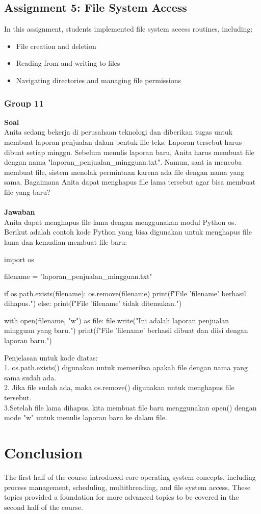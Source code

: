 \documentclass[12pt]{article}
\begin{document}
\subsection{Assignment 5: File System Access}
In this assignment, students implemented file system access routines, including:
\begin{itemize}
    \item File creation and deletion
    \item Reading from and writing to files
    \item Navigating directories and managing file permissions
\end{itemize}

\subsubsection{Group 11}

\textbf{Soal}
\\
Anita sedang bekerja di perusahaan teknologi dan diberikan tugas untuk membuat laporan penjualan dalam bentuk file teks. Laporan tersebut harus dibuat setiap minggu. Sebelum menulis laporan baru, Anita harus membuat file dengan nama "laporan\_penjualan\_mingguan.txt". Namun, saat ia mencoba membuat file, sistem menolak permintaan karena ada file dengan nama yang sama. Bagaimana Anita dapat menghapus file lama tersebut agar bisa membuat file yang baru?
\\\\
\textbf{Jawaban}\\
Anita dapat menghapus file lama dengan menggunakan modul Python os. Berikut adalah contoh kode Python yang bisa digunakan untuk menghapus file lama dan kemudian membuat file baru:\\
\begin{python}
    import os

    filename = "laporan_penjualan_mingguan.txt"

    if os.path.exists(filename):
        os.remove(filename)
        print(f"File '{filename}' berhasil dihapus.")
    else:
        print(f"File '{filename}' tidak ditemukan.")

    with open(filename, "w") as file:
        file.write("Ini adalah laporan penjualan mingguan yang baru.")
        print(f"File '{filename}' berhasil dibuat dan diisi dengan laporan baru.")

\end{python}
Penjelasan untuk kode diatas:
\\
1. os.path.exists() digunakan untuk memeriksa apakah file dengan nama yang sama sudah ada.\\
2. Jika file sudah ada, maka os.remove() digunakan untuk menghapus file tersebut.\\
3.Setelah file lama dihapus, kita membuat file baru menggunakan open() dengan mode "w" untuk menulis laporan baru ke dalam file.\\
\section{Conclusion}
The first half of the course introduced core operating system concepts, including process management, scheduling, multithreading, and file system access. These topics provided a foundation for more advanced topics to be covered in the second half of the course.
\end{document}
